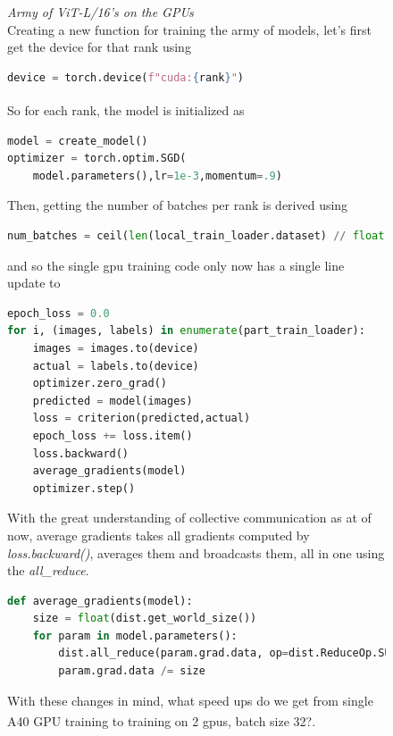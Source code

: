 \documentclass[12pt]{article}
\newcommand{\customtext}[3]{%
    \vspace{#2} %
    \fontsize{13}{8}\textcolor{#1}{\textit{#3}}%
}
\newcommand{\sidecite}[1]{\textsuperscript{\textcolor{blue}{\textbf{\scriptsize#1}}}}
\newcommand{\maincitecount}{\sidecite{\stepcounter{maincite}\themaincite}}
\begin{document}
\begin{figure}[!htb]
\begin{minipage}[t]{0.65\textwidth}
\customtext{xtitle}{0em}{Army of ViT-L/16's on the GPUs}\\
Creating a new function for training the army of models, let's first get the device 
for that rank using 
\begin{lstlisting}[language=python,style=python,basicstyle=\ttfamily\footnotesize]
device = torch.device(f"cuda:{rank}")
\end{lstlisting}
So for each rank, the model is initialized as\maincitecount
\begin{lstlisting}[language=python,style=python,basicstyle=\ttfamily\footnotesize]
model = create_model()
optimizer = torch.optim.SGD(
    model.parameters(),lr=1e-3,momentum=.9)
\end{lstlisting}
Then, getting the number of batches per rank is derived using 
\begin{lstlisting}[language=python,style=python,basicstyle=\ttfamily\footnotesize]
num_batches = ceil(len(local_train_loader.dataset) // float(bsz))
\end{lstlisting}
and so the single gpu training code only now has a single line update to
\begin{lstlisting}[language=python,style=python,basicstyle=\ttfamily\footnotesize]
epoch_loss = 0.0
for i, (images, labels) in enumerate(part_train_loader):
    images = images.to(device)
    actual = labels.to(device)
    optimizer.zero_grad()
    predicted = model(images)
    loss = criterion(predicted,actual)
    epoch_loss += loss.item()
    loss.backward()
    average_gradients(model)
    optimizer.step()
\end{lstlisting}
With the great understanding of collective communication as at of now, average gradients 
takes all gradients computed by {\it loss.backward()}, averages them and broadcasts them,
all in one using the {\it all\_reduce}.
\begin{lstlisting}[language=python,style=python,basicstyle=\ttfamily\footnotesize]
def average_gradients(model):
    size = float(dist.get_world_size())
    for param in model.parameters():
        dist.all_reduce(param.grad.data, op=dist.ReduceOp.SUM)
        param.grad.data /= size
\end{lstlisting}
With these changes in mind, what speed ups do we get from single A40 GPU training to training 
on 2 gpus, batch size 32?\maincitecount.

\end{minipage}
\end{figure}
\end{document}
